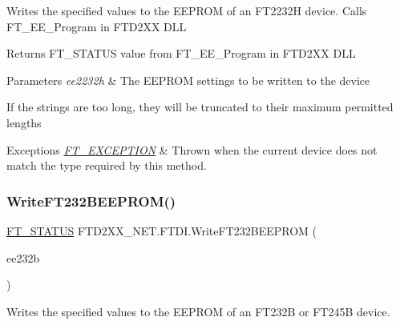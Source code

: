 Writes the specified values to the E\+E\+P\+R\+OM of an F\+T2232H device. Calls F\+T\+\_\+\+E\+E\+\_\+\+Program in F\+T\+D2\+XX D\+LL 

\begin{DoxyReturn}{Returns}
F\+T\+\_\+\+S\+T\+A\+T\+US value from F\+T\+\_\+\+E\+E\+\_\+\+Program in F\+T\+D2\+XX D\+LL
\end{DoxyReturn}

\begin{DoxyParams}{Parameters}
{\em ee2232h} & The E\+E\+P\+R\+OM settings to be written to the device\\
\hline
\end{DoxyParams}


If the strings are too long, they will be truncated to their maximum permitted lengths


\begin{DoxyExceptions}{Exceptions}
{\em \mbox{\hyperlink{class_f_t_d2_x_x___n_e_t_1_1_f_t_d_i_1_1_f_t___e_x_c_e_p_t_i_o_n}{F\+T\+\_\+\+E\+X\+C\+E\+P\+T\+I\+ON}}} & Thrown when the current device does not match the type required by this method.\\
\hline
\end{DoxyExceptions}
\mbox{\label{class_f_t_d2_x_x___n_e_t_1_1_f_t_d_i_a3c61a638655854afcccb470afa8760aa}} 
\subsubsection{\texorpdfstring{WriteFT232BEEPROM()}{WriteFT232BEEPROM()}}
{\footnotesize\ttfamily \mbox{\hyperlink{class_f_t_d2_x_x___n_e_t_1_1_f_t_d_i_aabe20ad905cc4ccc1e35dd5b877d9a83}{F\+T\+\_\+\+S\+T\+A\+T\+US}} F\+T\+D2\+X\+X\+\_\+\+N\+E\+T.\+F\+T\+D\+I.\+Write\+F\+T232\+B\+E\+E\+P\+R\+OM (\begin{DoxyParamCaption}\item[{\mbox{\hyperlink{class_f_t_d2_x_x___n_e_t_1_1_f_t_d_i_1_1_f_t232_b___e_e_p_r_o_m___s_t_r_u_c_t_u_r_e}{F\+T232\+B\+\_\+\+E\+E\+P\+R\+O\+M\+\_\+\+S\+T\+R\+U\+C\+T\+U\+RE}}}]{ee232b }\end{DoxyParamCaption})}



Writes the specified values to the E\+E\+P\+R\+OM of an F\+T232B or F\+T245B device. 

